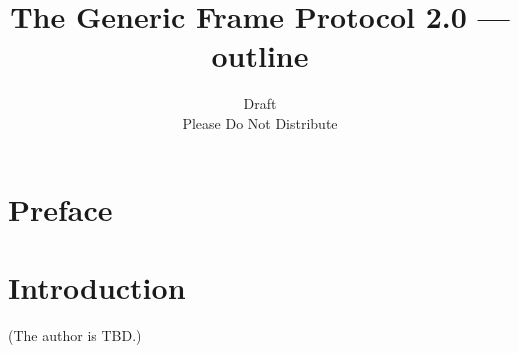



\renewcommand{\baselinestretch}{1}

\newcommand{\kbfn}[2]{\vspace{.15 in}\kfn{#1}\ \karg{#2}}
\newcommand{\kfn}[1]{{\bf #1}\index{#1}}	%
\newcommand{\karg}[1]{{\bf #1}}			%
\newcommand{\nikfn}[1]{{\bf #1}}		%
\newenvironment{gfpop}[2]{\kbfn{#1}{#2}}{}
\makeindex



\title{The Generic Frame Protocol 2.0 --- outline}

\author{Draft\\ Please Do Not Distribute}


\maketitle
\newpage

\tableofcontents
\newpage

\chapter*{Preface}

\chapter{Introduction}
(The author is TBD.)

